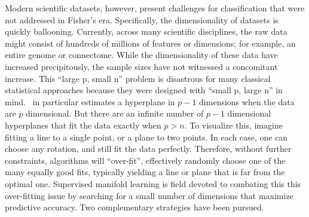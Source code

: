 \documentclass[10pt]{article}
\begin{document}

Modern scientific datasets, however, present challenges for classification that were not addressed in Fisher's era.
Specifically, the dimensionality of datasets is quickly ballooning.
Currently, across many scientific disciplines, the raw data might consist of hundreds of millions  of features or dimensions; for example, an entire genome or connectome.  While the dimensionality of these data have increased precipitously, the sample sizes have not witnessed a concomitant increase.
This ``large p, small n'' problem is disastrous for many classical statistical approaches because they were designed with ``small p, large n'' in mind. \Lda~in particular estimates a hyperplane in $p-1$ dimensions when the data are $p$ dimensional.  But there are an infinite number of $p-1$ dimensional hyperplanes that fit the data exactly when $p>n$.  To visualize this, imagine fitting a line to a single point, or a plane to two points.  In each case, one can choose any rotation, and still fit the data perfectly.  
Therefore, without further constraints, algorithms will ``over-fit'', effectively randomly choose one of the many equally good fits, typically yielding a line or plane that is far from the optimal one.
Supervised manifold learning is field devoted to combating this 
this over-fitting issue  by searching for a small number of dimensions that maximize predictive accuracy.
Two complementary strategies have been pursued.
\end{document}
